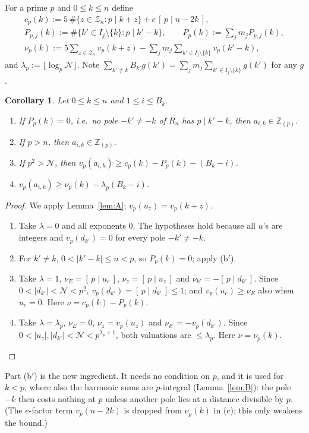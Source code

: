 \documentclass[11pt]{amsart}
\newtheorem{corollary}[theorem]{Corollary}
\theoremstyle{definition}
\theoremstyle{remark}
\numberwithin{equation}{section}
\newcommand{\ZZ}{\mathbb{Z}}
\newcommand{\cN}{\mathcal{N}}
\newcommand{\ind}[1]{[\,#1\,]}
\begin{document}
For a prime $p$ and $0\le k\le n$ define
\begin{gather*}
  c_p(k):=5\,\#\{z\in\mathcal Z_n:p\mid k+z\}+e\,\ind{p\mid n-2k},\\
  P_{p,j}(k):=\#\{k'\in I_j\setminus\{k\}:p\mid k'-k\},\qquad P_p(k):=\sum_jm_jP_{p,j}(k),\\
  \nu_p(k):=5\sum_{z\in\mathcal Z_n}v_p(k+z)-\sum_jm_j\sum_{k'\in I_j\setminus\{k\}}v_p(k'-k),
\end{gather*}
and $\lambda_p:=\lfloor\log_p\cN\rfloor$. Note $\sum_{k'\ne k}B_{k'}g(k')=\sum_jm_j\sum_{k'\in I_j\setminus\{k\}}g(k')$
for any $g$.

\begin{corollary}\label{cor:A}
Let $0\le k\le n$ and $1\le i\le B_k$.
\begin{enumerate}
\item[(b$'$)] If $P_p(k)=0$, i.e.\ no pole $-k'\ne-k$ of $R_n$ has $p\mid k'-k$, then $a_{i,k}\in\ZZ_{(p)}$.
\item[(a)] If $p>n$, then $a_{i,k}\in\ZZ_{(p)}$.
\item[(b)] If $p^2>\cN$, then $v_p(a_{i,k})\ge c_p(k)-P_p(k)-(B_k-i)$.
\item[(c)] $v_p(a_{i,k})\ge \nu_p(k)-\lambda_p(B_k-i)$.
\end{enumerate}
\end{corollary}

\begin{proof}
We apply Lemma~\ref{lem:A}; $v_p(u_z)=v_p(k+z)$.
\begin{enumerate}
\item[(b$'$)] Take $\lambda=0$ and all exponents $0$. The hypotheses hold because all $u$'s are integers and
  $v_p(d_{k'})=0$ for every pole $-k'\ne-k$.
\item[(a)] For $k'\ne k$, $0<|k'-k|\le n<p$, so $P_p(k)=0$; apply (b$'$).
\item[(b)] Take $\lambda=1$, $\nu_E=\ind{p\mid u_e}$, $\nu_z=\ind{p\mid u_z}$ and $\nu_{k'}=-\ind{p\mid d_{k'}}$.
  Since $0<|d_{k'}|<\cN<p^2$, $v_p(d_{k'})=\ind{p\mid d_{k'}}\le1$; and $v_p(u_e)\ge\nu_E$ also when $u_e=0$.
  Here $\nu=c_p(k)-P_p(k)$.
\item[(c)] Take $\lambda=\lambda_p$, $\nu_E=0$, $\nu_z=v_p(u_z)$ and $\nu_{k'}=-v_p(d_{k'})$. Since
  $0<|u_z|,|d_{k'}|<\cN<p^{\lambda_p+1}$, both valuations are $\le\lambda_p$. Here $\nu=\nu_p(k)$.\qedhere
\end{enumerate}
\end{proof}

Part (b$'$) is the new ingredient. It needs no condition on $p$, and it is used for $k<p$, where also the
harmonic sums are $p$-integral (Lemma~\ref{lem:B}): the pole $-k$ then costs nothing at $p$ unless another pole
lies at a distance divisible by $p$. (The $e$-factor term $v_p(n-2k)$ is dropped from $\nu_p(k)$ in (c); this only
weakens the bound.)
\end{document}
